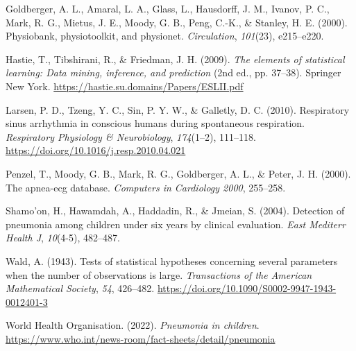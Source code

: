 \documentclass[
]{article}
\newlength{\cslhangindent}
\newlength{\cslentryspacingunit} %
\newenvironment{CSLReferences}[2] %
 {%
  \setlength{\parindent}{0pt}
  \ifodd #1
  \let\oldpar\par
  \def\par{\hangindent=\cslhangindent\oldpar}
  \fi
  \setlength{\parskip}{#2\cslentryspacingunit}
 }%
 {}
\begin{document}
\hypertarget{refs}{}
\begin{CSLReferences}{1}{1}
\leavevmode{}%
Goldberger, A. L., Amaral, L. A., Glass, L., Hausdorff, J. M., Ivanov,
P. C., Mark, R. G., Mietus, J. E., Moody, G. B., Peng, C.-K., \&
Stanley, H. E. (2000). Physiobank, physiotoolkit, and physionet.
\emph{Circulation}, \emph{101}(23), e215--e220.

\leavevmode{}%
Hastie, T., Tibshirani, R., \& Friedman, J. H. (2009). \emph{The
elements of statistical learning: Data mining, inference, and
prediction} (2nd ed., pp. 37--38). Springer New York.
\url{https://hastie.su.domains/Papers/ESLII.pdf}

\leavevmode{}%
Larsen, P. D., Tzeng, Y. C., Sin, P. Y. W., \& Galletly, D. C. (2010).
Respiratory sinus arrhythmia in conscious humans during spontaneous
respiration. \emph{Respiratory Physiology \& Neurobiology},
\emph{174}(1--2), 111--118.
\url{https://doi.org/10.1016/j.resp.2010.04.021}

\leavevmode{}%
Penzel, T., Moody, G. B., Mark, R. G., Goldberger, A. L., \& Peter, J.
H. (2000). The apnea-ecg database. \emph{Computers in Cardiology 2000},
255--258.

\leavevmode{}%
Shamo'on, H., Hawamdah, A., Haddadin, R., \& Jmeian, S. (2004).
Detection of pneumonia among children under six years by clinical
evaluation. \emph{East Mediterr Health J}, \emph{10}(4-5), 482--487.

\leavevmode{}%
Wald, A. (1943). Tests of statistical hypotheses concerning several
parameters when the number of observations is large. \emph{Transactions
of the American Mathematical Society}, \emph{54}, 426--482.
\url{https://doi.org/10.1090/S0002-9947-1943-0012401-3}

\leavevmode{}%
World Health Organisation. (2022). \emph{Pneumonia in children}.
\url{https://www.who.int/news-room/fact-sheets/detail/pneumonia}

\end{CSLReferences}
\end{document}
